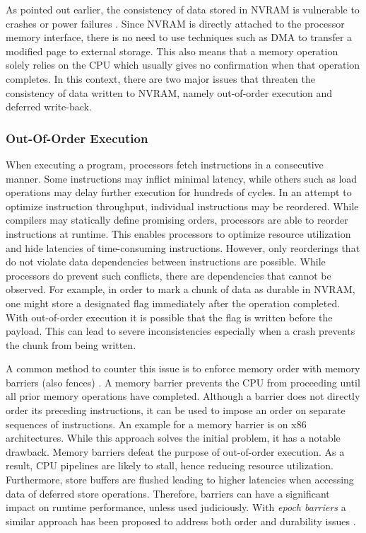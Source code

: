 As pointed out earlier, the consistency of data stored in \ac{NVRAM} is
vulnerable to crashes or power failures \cite{condit2009better,
dulloor2014system, oukid2017data}. Since \ac{NVRAM} is directly attached to the
processor memory interface, there is no need to use techniques such as \ac{DMA}
to transfer a modified page to external storage. This also means that a memory
operation solely relies on the \ac{CPU} which usually gives no confirmation when
that operation completes. In this context, there are two major issues that
threaten the consistency of data written to \ac{NVRAM}, namely out-of-order
execution and deferred write-back.

\subsubsection{Out-Of-Order Execution}

When executing a program, processors fetch instructions in a consecutive manner.
Some instructions may inflict minimal latency, while others such as load
operations may delay further execution for hundreds of cycles. In an attempt to
optimize instruction throughput, individual instructions may be reordered. While
compilers may statically define promising orders, processors are able to reorder
instructions at runtime. This enables processors to optimize resource
utilization and hide latencies of time-consuming instructions. However, only
reorderings that do not violate data dependencies between instructions are
possible. While processors do prevent such conflicts, there are dependencies
that cannot be observed. For example, in order to mark a chunk of data as
durable in \ac{NVRAM}, one might store a designated flag immediately after the
operation completed. With out-of-order execution it is possible that the flag is
written before the payload. This can lead to severe inconsistencies especially
when a crash prevents the chunk from being written.

A common method to counter this issue is to enforce memory order with memory
barriers (also fences) \cite{dulloor2014system, schwalb2016hyrise,
oukid2017data}. A memory barrier prevents the \ac{CPU} from proceeding until all
prior memory operations have completed. Although a barrier does not directly
order its preceding instructions, it can be used to impose an order on separate
sequences of instructions. An example for a memory barrier is  on
x86 architectures. While this approach solves the initial problem, it has a
notable drawback. Memory barriers defeat the purpose of out-of-order execution.
As a result, \ac{CPU} pipelines are likely to stall, hence reducing resource
utilization. Furthermore, store buffers are flushed leading to higher latencies
when accessing data of deferred store operations. Therefore, barriers can have a
significant impact on runtime performance, unless used judiciously. With
\emph{epoch barriers} a similar approach has been proposed to address both order
and durability issues \cite{condit2009better}.

